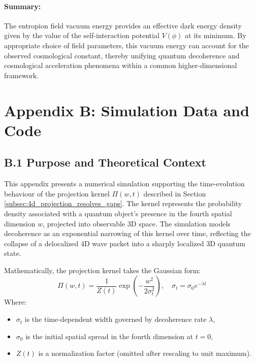 \documentclass[12pt]{article}
\begin{document}
\vspace{1em}
\noindent
\paragraph{Summary:}

The entropion field vacuum energy provides an effective dark energy density given by the value of the self-interaction potential \(V(\phi)\) at its minimum. By appropriate choice of field parameters, this vacuum energy can account for the observed cosmological constant, thereby unifying quantum decoherence and cosmological acceleration phenomena within a common higher-dimensional framework.

\section*{Appendix B: Simulation Data and Code}

\subsection*{B.1 Purpose and Theoretical Context}

This appendix presents a numerical simulation supporting the time-evolution behaviour of the projection kernel $\Pi(w,t)$ described in Section \ref{subsec:4d_projection_resolves_gaps}. The kernel represents the probability density associated with a quantum object’s presence in the fourth spatial dimension $w$, projected into observable 3D space. The simulation models decoherence as an exponential narrowing of this kernel over time, reflecting the collapse of a delocalized 4D wave packet into a sharply localized 3D quantum state.

Mathematically, the projection kernel takes the Gaussian form:
\begin{equation}
\Pi(w,t) = \frac{1}{Z(t)} \exp\left( -\frac{w^2}{2\sigma_t^2} \right), \quad \sigma_t = \sigma_0 e^{-\lambda t}
\end{equation}
Where:
\begin{itemize}
  \item $\sigma_t$ is the time-dependent width governed by decoherence rate $\lambda$,
  \item $\sigma_0$ is the initial spatial spread in the fourth dimension at $t=0$,
  \item $Z(t)$ is a normalization factor (omitted after rescaling to unit maximum).
\end{itemize}
\end{document}
